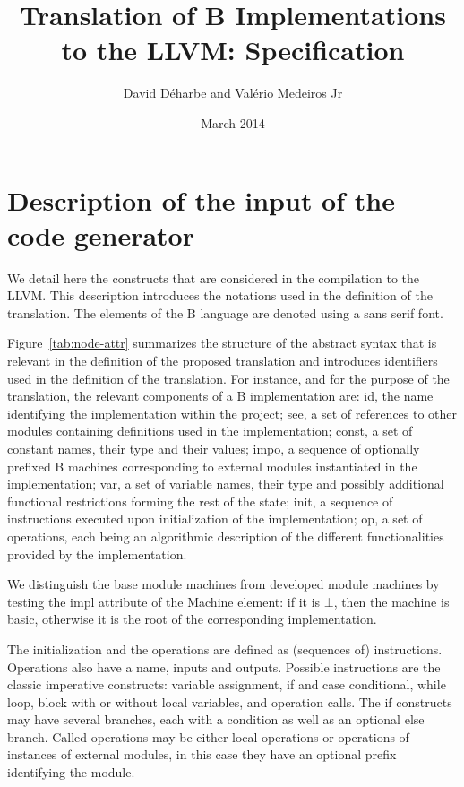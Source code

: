 \documentclass{llncs}
\title{Translation of B Implementations to the LLVM: Specification}
\author{David Déharbe and Valério Medeiros Jr}
\institute{Federal University of Rio Grande do Norte\\
Federal Institute of Education Science and Technology of Rio Grande do Norte\\
 Natal (Brazil)}
\date{March 2014}
\newcommand{\B}[1]{\textsf{#1}}
\begin{document}
\maketitle

\section{Description of the input of the code generator}
\label{sec:b-ast}

We detail here the constructs that are considered in the compilation to the
LLVM. This description introduces the notations used in the definition of the
translation. The elements of the B language are denoted using a \B{sans serif}
font.

Figure~\ref{tab:node-attr} summarizes the structure
of the abstract syntax that is relevant in the definition of the proposed
translation and introduces identifiers used in the definition of the
translation. For instance, and for the purpose of the translation, the relevant
components of a B implementation are: \B{id}, the name identifying the
implementation within the project; \B{see}, a set of references to other modules
containing definitions used in the implementation; \B{const}, a set of constant
names, their type and their values; \B{impo}, a sequence of optionally
prefixed B machines corresponding to external modules instantiated in the
implementation; \B{var}, a set of variable names, their type and possibly
additional functional restrictions forming the rest of the state; \B{init}, a
sequence of instructions executed upon initialization of the implementation;
\B{op}, a set of operations, each being an algorithmic description of the
different functionalities provided by the implementation.

We distinguish the base module machines from developed module machines by
testing the \B{impl} attribute of the \B{Machine} element: if it is $\bot$, then
the machine is basic, otherwise it is the root of the corresponding
implementation.

The initialization and the operations are defined as (sequences of)
instructions. Operations also have a name, inputs and outputs. Possible
instructions are the classic imperative constructs: variable assignment, if and
case conditional, while loop, block with or without local variables, and
operation calls. The if constructs may have several branches, each with a
condition as well as an optional else branch. Called operations may be either
local operations or operations of instances of external modules, in this case
they have an optional prefix identifying the module.
\end{document}
